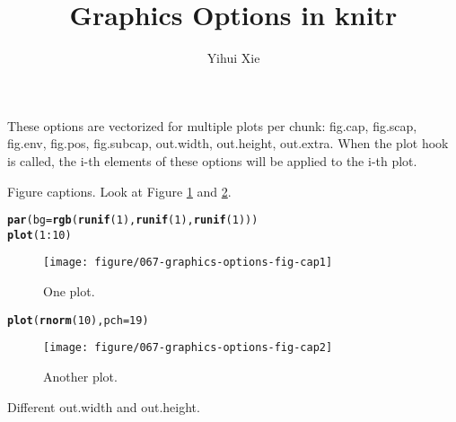 \documentclass{article}\usepackage[]{graphicx}\usepackage[]{color}
\title{Graphics Options in knitr}
\author{Yihui Xie}
\makeatletter
\newcommand{\hlnum}[1]{\textcolor[rgb]{0.686,0.059,0.569}{#1}}%
\newcommand{\hlopt}[1]{\textcolor[rgb]{0,0,0}{#1}}%
\newcommand{\hlstd}[1]{\textcolor[rgb]{0.345,0.345,0.345}{#1}}%
\newcommand{\hlkwc}[1]{\textcolor[rgb]{0.333,0.667,0.333}{#1}}%
\newcommand{\hlkwd}[1]{\textcolor[rgb]{0.737,0.353,0.396}{\textbf{#1}}}%
\newenvironment{kframe}{%
 \def\at@end@of@kframe{}%
 \ifinner\ifhmode%
  \def\at@end@of@kframe{\end{minipage}}%
  \begin{minipage}{\columnwidth}%
 \fi\fi%
 \def\FrameCommand##1{\hskip\@totalleftmargin \hskip-\fboxsep
 \colorbox{shadecolor}{##1}\hskip-\fboxsep
     \hskip-\linewidth \hskip-\@totalleftmargin \hskip\columnwidth}%
 \MakeFramed {\advance\hsize-\width
   \@totalleftmargin\z@ \linewidth\hsize
   \@setminipage}}%
 {\par\unskip\endMakeFramed%
 \at@end@of@kframe}
\newenvironment{knitrout}{}{} %
\makeatother
\begin{document}
\maketitle




These options are vectorized for multiple plots per chunk: fig.cap, fig.scap, fig.env, fig.pos, fig.subcap, out.width, out.height, out.extra.
When the plot hook is called, the i-th elements of these options will be
applied to the i-th plot.

Figure captions. Look at Figure \ref{fig:fig-cap1} and \ref{fig:fig-cap2}.

\begin{knitrout}
\color{fgcolor}\begin{kframe}
\begin{alltt}
\hlkwd{par}\hlstd{(}\hlkwc{bg} \hlstd{=} \hlkwd{rgb}\hlstd{(}\hlkwd{runif}\hlstd{(}\hlnum{1}\hlstd{),} \hlkwd{runif}\hlstd{(}\hlnum{1}\hlstd{),} \hlkwd{runif}\hlstd{(}\hlnum{1}\hlstd{)))}
\hlkwd{plot}\hlstd{(}\hlnum{1}\hlopt{:}\hlnum{10}\hlstd{)}
\end{alltt}
\end{kframe}\begin{figure}[H]

\texttt{[image: figure/067-graphics-options-fig-cap1]} \caption[One plot]{One plot.\label{fig:fig-cap1}}
\end{figure}

\begin{kframe}\begin{alltt}
\hlkwd{plot}\hlstd{(}\hlkwd{rnorm}\hlstd{(}\hlnum{10}\hlstd{),} \hlkwc{pch} \hlstd{=} \hlnum{19}\hlstd{)}
\end{alltt}
\end{kframe}\begin{figure}[H]

\texttt{[image: figure/067-graphics-options-fig-cap2]} \caption[Another plot]{Another plot.\label{fig:fig-cap2}}
\end{figure}


\end{knitrout}


Different out.width and out.height.
\end{document}
